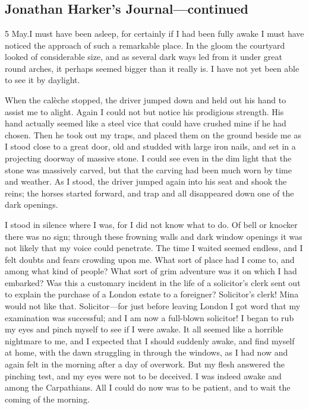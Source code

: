 \chapter[Chapter \thechapter]{}

\section{Jonathan Harker's Journal—continued}

\begin{diary}{5 May.}I must have been asleep, for certainly if I had been fully awake I must have noticed the approach of such a remarkable place. In the gloom the courtyard looked of considerable size, and as several dark ways led from it under great round arches, it perhaps seemed bigger than it really is. I have not yet been able to see it by daylight.

When the calèche stopped, the driver jumped down and held out his hand to assist me to alight. Again I could not but notice his prodigious strength. His hand actually seemed like a steel vice that could have crushed mine if he had chosen. Then he took out my traps, and placed them on the ground beside me as I stood close to a great door, old and studded with large iron nails, and set in a projecting doorway of massive stone. I could see even in the dim light that the stone was massively carved, but that the carving had been much worn by time and weather. As I stood, the driver jumped again into his seat and shook the reins; the horses started forward, and trap and all disappeared down one of the dark openings.

I stood in silence where I was, for I did not know what to do. Of bell or knocker there was no sign; through these frowning walls and dark window openings it was not likely that my voice could penetrate. The time I waited seemed endless, and I felt doubts and fears crowding upon me. What sort of place had I come to, and among what kind of people? What sort of grim adventure was it on which I had embarked? Was this a customary incident in the life of a solicitor's clerk sent out to explain the purchase of a London estate to a foreigner? Solicitor's clerk! Mina would not like that. Solicitor—for just before leaving London I got word that my examination was successful; and I am now a full-blown solicitor! I began to rub my eyes and pinch myself to see if I were awake. It all seemed like a horrible nightmare to me, and I expected that I should suddenly awake, and find myself at home, with the dawn struggling in through the windows, as I had now and again felt in the morning after a day of overwork. But my flesh answered the pinching test, and my eyes were not to be deceived. I was indeed awake and among the Carpathians. All I could do now was to be patient, and to wait the coming of the morning.


\end{diary}
